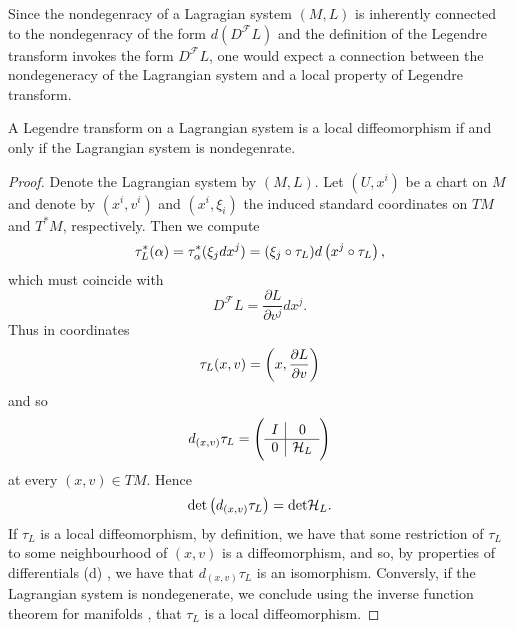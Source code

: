 Since the nondegenracy of a Lagragian system $(M,L)$ is inherently connected to the nondegenracy of the form $d(D^\mathcal{F}L)$ and the definition of the Legendre transform invokes the form $D^\mathcal{F}L$, one would expect a connection between the nondegeneracy of the Lagrangian system and a local property of Legendre transform.

\begin{lemma}
	\label{lem:local_diffeomorphism}
	A Legendre transform on a Lagrangian system is a local diffeomorphism if and only if the Lagrangian system is nondegenrate.	
\end{lemma}

\begin{proof}
	Denote the Lagrangian system by $(M,L)$. Let $(U,x^i)$ be a chart on $M$ and denote by $(x^i,v^i)$ and $(x^i,\xi_i)$ the induced standard coordinates on $TM$ and $T^*M$, respectively. Then we compute
	\begin{equation*}
		\tau^*_L(\alpha) = \tau^*_\alpha(\xi_j dx^j) = (\xi_j \circ \tau_L)d\del[1]{x^j \circ \tau_L},
	\end{equation*}
	\noindent which must coincide with
	\begin{equation*}
		D^\mathcal{F}L = \frac{\partial L}{\partial v^j}dx^j.
	\end{equation*}
	Thus in coordinates
	\begin{equation}
		\label{eq:Legendre_in_coordinates}
		\tau_L(x,v) = \del[3]{x,\frac{\partial L}{\partial v}}
	\end{equation}
	\noindent and so
	\begin{equation*}
		d_{(x,v)}\tau_L = \del{\begin{array}{c|c}
			I & 0\\\hline
			0 & \mathcal{H}_L
		\end{array}}
	\end{equation*}
	\noindent at every $(x,v) \in TM$. Hence 
	\begin{equation*}
		\det \del[1]{d_{(x,v)}\tau_L} = \det \mathcal{H}_L.
	\end{equation*}
	If $\tau_L$ is a local diffeomorphism, by definition, we have that some restriction of $\tau_L$ to some neighbourhood of $(x,v)$ is a diffeomorphism, and so, by properties of differentials (d) \cite[55]{lee:smooth_manifolds:2013}, we have that $d_{(x,v)}\tau_L$ is an isomorphism. Conversly, if the Lagrangian system is nondegenerate, we conclude using the inverse function theorem for manifolds \cite[79]{lee:smooth_manifolds:2013}, that $\tau_L$ is a local diffeomorphism.
\end{proof}

